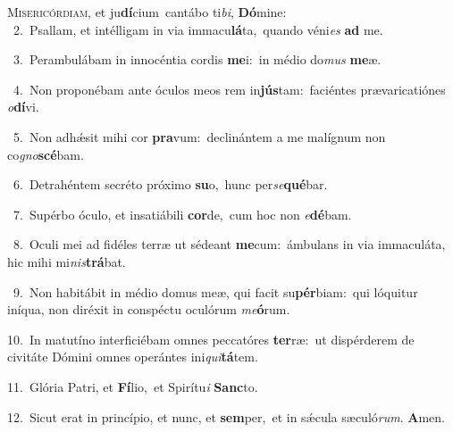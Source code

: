 \lettrine{\initial\textcolor{\initialcolor}{M}}{isericórdiam,} et ju\-\textbf{dí}\-cium~\star cantábo ti\-\textit{bi}\-, \textbf{Dó}\-mine:\\
{\numbfont\textcolor{\numbcolor}{~2.}}~Psallam, et intélligam in via immacu\-\textbf{lá}\-ta,~\star quando véni\textit{es} \textbf{ad} me.\par
{\numbfont\textcolor{\numbcolor}{~3.}}~Perambulábam in innocéntia cordis \textbf{me}\-i:~\star in médio do\textit{mus} \textbf{me}\-æ.\par
{\numbfont\textcolor{\numbcolor}{~4.}}~Non proponébam ante óculos meos rem in\-\textbf{jús}\-tam:~\star faciéntes prævaricatiónes \textit{o}\-\textbf{dí}vi.\par
{\numbfont\textcolor{\numbcolor}{~5.}}~Non adhǽsit mihi cor \textbf{pra}\-vum:~\star declinántem a me malígnum non co\-\textit{gno}\-\textbf{scé}bam.\par
{\numbfont\textcolor{\numbcolor}{~6.}}~Detrahéntem secréto próximo \textbf{su}\-o,~\star hunc per\-\textit{se}\-\textbf{qué}bar.\par
{\numbfont\textcolor{\numbcolor}{~7.}}~Supérbo óculo, et insatiábili \textbf{cor}\-de,~\star cum hoc non \textit{e}\-\textbf{dé}bam.\par
{\numbfont\textcolor{\numbcolor}{~8.}}~Oculi mei ad fidéles terræ ut sédeant \textbf{me}\-cum:~\star ámbulans in via immaculáta, hic mihi mi\-\textit{nis}\-\textbf{trá}bat.\par
{\numbfont\textcolor{\numbcolor}{~9.}}~Non habitábit in médio domus meæ, qui facit su\-\textbf{pér}\-biam:~\star qui lóquitur iníqua, non diréxit in conspéctu oculórum \textit{me}\-\textbf{ó}rum.\par
{\numbfont\textcolor{\numbcolor}{10.}}~In matutíno interficiébam omnes peccatóres \textbf{ter}\-ræ:~\star ut dispérderem de civitáte Dómini omnes operántes ini\-\textit{qui}\-\textbf{tá}tem.\par
{\numbfont\textcolor{\numbcolor}{11.}}~Glória Patri, et \textbf{Fí}\-lio,~\star et Spirítu\textit{i} \textbf{Sanc}\-to.\par
{\numbfont\textcolor{\numbcolor}{12.}}~Sicut erat in princípio, et nunc, et \textbf{sem}\-per,~\star et in sǽcula sæculó\-\textit{rum}\-. \textbf{A}\-men.\par
